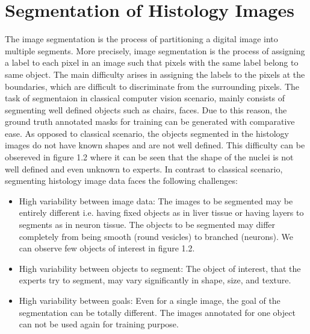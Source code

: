 \section{Segmentation of Histology Images}
The image segmentation is the process of partitioning a digital image into multiple segments. More precisely, image segmentation is the process of assigning a label to each pixel in an image such that pixels with the same label belong to same object. The main difficulty arises in assigning the labels to the pixels at the boundaries, which are difficult to discriminate from the surrounding pixels. The task of segmentaion in classical computer vision scenario, mainly consists of segmenting well defined objects  such as chairs, faces. Due to this reason, the ground truth annotated masks for training can be generated with comparative ease. As opposed to classical scenario, the objects segmented in the histology images do not have known shapes and are not well defined. This difficulty can be obsereved in figure 1.2 where it can be seen that the shape of the nuclei is not well defined and even unknown to experts. In contrast to classical scenario, segmenting histology image data faces the following challenges:
\begin{itemize}
\item High variability between image data: The images to be segmented may be entirely different i.e. having fixed objects as in liver tissue or having layers to segments as in neuron tissue. The objects to be segmented may differ completely from being smooth (round vesicles) to branched (neurons). We can observe few objects of interest in figure 1.2.
\item High variability between objects to segment: The object of interest, that the experts try to segment, may vary significantly in shape, size, and texture.
\item High variability between goals: Even for a single image, the goal of the segmentation can be totally different. The images annotated for one object can not be used again for training purpose.
\end{itemize}

